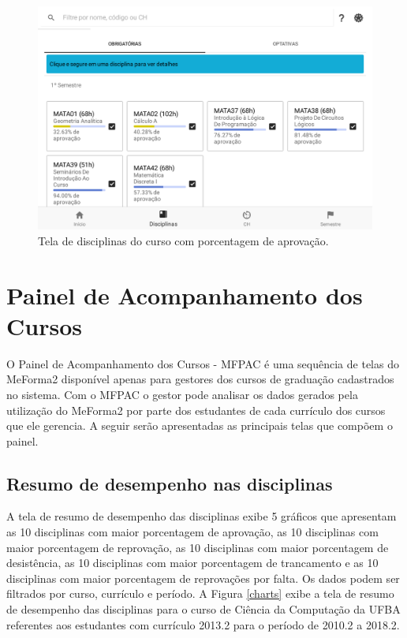\begin{figure}[H]
	   \centering
	   		\includegraphics[scale=0.25]{pics/c3/14-percentage.png}
	   \caption{Tela de disciplinas do curso com porcentagem de aprovação.}
	   \label{percentages}
\end{figure}

\section{Painel de Acompanhamento dos Cursos}

O Painel de Acompanhamento dos Cursos - MFPAC é uma sequência de telas do MeForma2 disponível apenas para gestores dos cursos de graduação cadastrados no sistema. Com o MFPAC o gestor pode analisar os dados gerados pela utilização do MeForma2 por parte dos estudantes de cada currículo dos cursos que ele gerencia. A seguir serão apresentadas as principais telas que compõem o painel.

\subsection{Resumo de desempenho nas disciplinas}

A tela de resumo de desempenho das disciplinas exibe 5 gráficos que apresentam as 10 disciplinas com maior porcentagem de aprovação, as 10 disciplinas com maior porcentagem de reprovação, as 10 disciplinas com maior porcentagem de desistência, as 10 disciplinas com maior porcentagem de trancamento e as 10 disciplinas com maior porcentagem de reprovações por falta. Os dados podem ser filtrados por curso, currículo e período. A Figura \ref{charts} exibe a tela de resumo de desempenho das disciplinas para o curso de Ciência da Computação da UFBA referentes aos estudantes com currículo 2013.2 para o período de 2010.2 a 2018.2.

